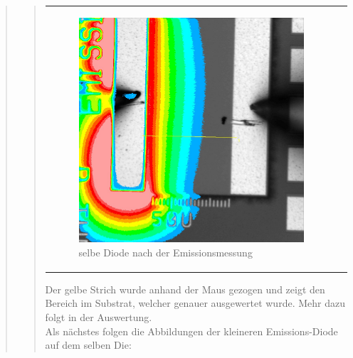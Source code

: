 \begin{quote}
\begin{quote}
\begin{center}
\begin{tabular}{ll}
\begin{minipage}{0.6\textwidth}
                         \begin{figure}[H]
                            \label{fig:asdfasdf}
                            \includegraphics[scale=0.25, trim = 0cm 0cm 0cm
                            0cm,
                            clip]{./Emissionsbilder/eins/nach_Emission_mit_Distanzen.jpg}
                            \caption{selbe Diode nach der Emissionsmessung}
                        \end{figure}
                   \vspace{-1.5em}

                    \end{minipage}

                \end{tabular}
                \end{center}

        \vspace{2em}

        Der gelbe Strich wurde anhand der Maus gezogen und zeigt den Bereich im
        Substrat, welcher genauer ausgewertet wurde. Mehr dazu folgt in der
        Auswertung.\\

        Als nächstes folgen die Abbildungen der kleineren Emissions-Diode auf
        dem selben Die:



\end{quote}
\end{quote}
